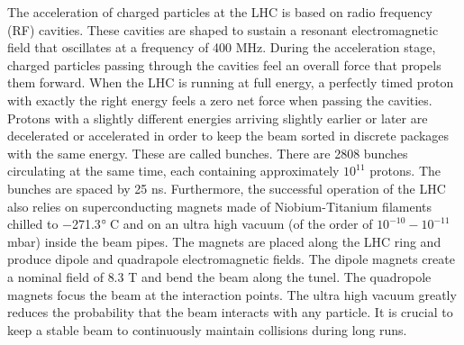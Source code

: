 The acceleration of charged particles at the LHC is based on radio frequency (RF) cavities. These cavities are shaped to sustain a resonant electromagnetic field that oscillates at a frequency of 400 MHz. During the acceleration stage, charged particles passing through the cavities feel an overall force that propels them forward. When the LHC is running at full energy, a perfectly timed proton with exactly the right energy feels a zero net force when passing the cavities. Protons with a slightly different energies arriving slightly earlier or later are decelerated or accelerated in order to keep the beam sorted in discrete packages with the same energy. These are called bunches. There are 2808 bunches circulating at the same time, each containing approximately $10^{11}$ protons. The bunches are spaced by 25 ns. Furthermore, the successful operation of the LHC also relies on superconducting magnets made of Niobium-Titanium filaments chilled to $-$271.3$^\circ\,$C and on an ultra high vacuum (of the order of $10^{-10}-10^{-11}$ mbar) inside the beam pipes. The magnets are placed along the LHC ring and produce dipole and quadrapole electromagnetic fields. The dipole magnets create a nominal field of $8.3$ T and bend the beam along the tunel. The quadropole magnets focus the beam at the interaction points. The ultra high vacuum greatly reduces the probability that the beam interacts with any particle. It is crucial to keep a stable beam to continuously maintain collisions during long runs.

